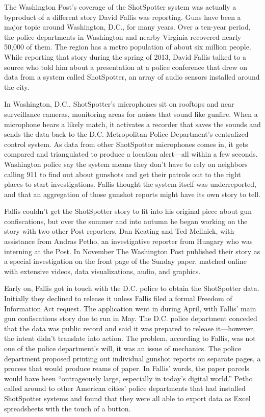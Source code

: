 The Washington Post's coverage of the ShotSpotter system was actually a
byproduct of a different story David Fallis was reporting. Guns have been
a major topic around Washington, D.C., for many years. Over a ten-year
period, the police departments in Washington and nearby Virginia recovered
nearly 50,000 of them. The region has a metro population of about
six million people. While reporting that story during the spring of 2013,
David Fallis talked to a source who told him about a presentation at a police
conference that drew on data from a system called ShotSpotter, an array of
audio sensors installed around the city.

In Washington, D.C., ShotSpotter's microphones sit on rooftops and near
surveillance cameras, monitoring areas for noises that sound like gunfire.
When a microphone hears a likely match, it activates a recorder that saves
the sounds and sends the data back to the D.C. Metropolitan Police Department's
centralized control system. As data from other ShotSpotter microphones
comes in, it gets compared and triangulated to produce a location
alert—all within a few seconds. Washington police say the system means
they don't have to rely on neighbors calling 911 to find out about gunshots
and get their patrols out to the right places to start investigations. Fallis
thought the system itself was underreported, and that an aggregation of
those gunshot reports might have its own story to tell.

Fallis couldn't get the ShotSpotter story to fit into his original piece about
gun confiscations, but over the summer and into autumn he began working
on the story with two other Post reporters, Dan Keating and Ted Mellnick,
with assistance from Andras Petho, an investigative reporter from
Hungary who was interning at the Post. In November The Washington Post
published their story as a special investigation on the front page of the
Sunday paper, matched online with extensive videos, data visualizations,
audio, and graphics.

Early on, Fallis got in touch with the D.C. police to obtain the ShotSpotter
data. Initially they declined to release it unless Fallis filed a formal Freedom
of Information Act request. The application went in during April, with Fallis'
main gun confiscations story due to run in May. The D.C. police department
conceded that the data was public record and said it was prepared
to release it—however, the intent didn't translate into action. The problem,
according to Fallis, was not one of the police department's will, it was an
issue of mechanics. The police department proposed printing out individual
gunshot reports on separate pages, a process that would produce reams
of paper. In Fallis' words, the paper parcels would have been ``outrageously
large, especially in today's digital world.'' Petho called around to other
American cities' police departments that had installed ShotSpotter systems
and found that they were all able to export data as Excel spreadsheets with
the touch of a button.

